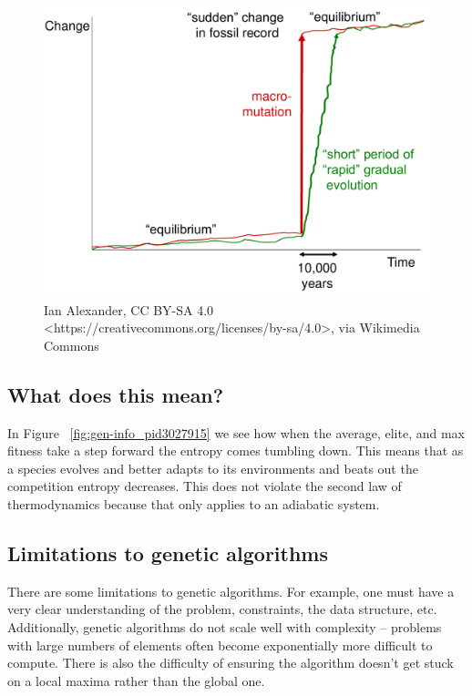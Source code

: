 \documentclass[11pt]{article}
\begin{document}
\begin{figure}[h]
	\begin{center}
	\includegraphics[scale=0.25]{Punctuated_Equilibrium.pdf}
	\caption{ \small Ian Alexander, CC BY-SA 4.0
          <https://creativecommons.org/licenses/by-sa/4.0>, via
          Wikimedia Commons }
\end{center}
\end{figure}

\subsection{What does this mean?}
\label{sec😮rgf7b36ed}

In Figure ~\ref{fig:gen-info_pid3027915} we see how when the average, elite, and max fitness take a
step forward the entropy comes tumbling down. This means that as a
species evolves and better adapts to its environments and beats out
the competition entropy decreases. This does not violate the second
law of thermodynamics because that only applies to an adiabatic
system.

\subsection{Limitations to genetic algorithms}
\label{sec:org148bf83}

There are some limitations to genetic algorithms. For example, one
must have a very clear understanding of the problem, constraints, the
data structure, etc. Additionally, genetic algorithms do not scale
well with complexity -- problems with large numbers of elements often
become exponentially more difficult to compute. There is also the
difficulty of ensuring the algorithm doesn't get stuck on a local
maxima rather than the global one.
\end{document}
